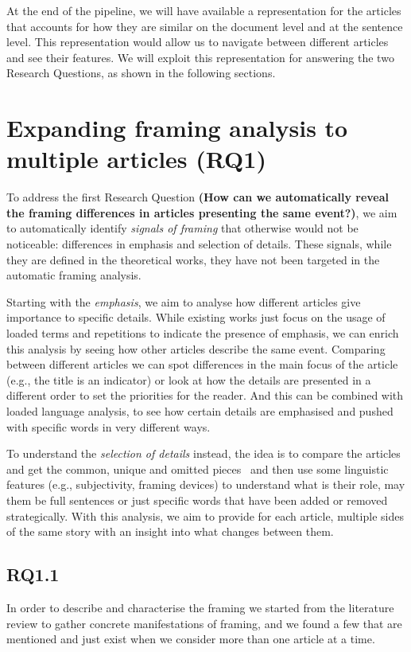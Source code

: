 At the end of the pipeline, we will have available a representation for the articles that accounts for how they are similar on the document level and at the sentence level.
This representation would allow us to navigate between different articles and see their features. We will exploit this representation for answering the two Research Questions, as shown in the following sections.

\section{Expanding framing analysis to multiple articles (RQ1)}
\label{sec:prop_rq1}

To address the first Research Question
\textbf{(How can we automatically reveal the framing differences in articles presenting the same event?)},
we aim to automatically identify \textit{signals of framing} that otherwise would not be noticeable: differences in emphasis and selection of details.
These signals, while they are defined in the theoretical works, they have not been targeted in the automatic framing analysis.

Starting with the \textit{emphasis}, we aim to analyse how different articles give importance to specific details.
While existing works just focus on the usage of loaded terms and repetitions to indicate the presence of emphasis, we can enrich this analysis by seeing how other articles describe the same event.
Comparing between different articles we can spot differences in the main focus of the article (e.g., the title is an indicator) or look at how the details are presented in a different order to set the priorities for the reader.
And this can be combined with loaded language analysis, to see how certain details are emphasised and pushed with specific words in very different ways.

To understand the \textit{selection of details} instead, the idea is to compare the articles and get the common, unique and omitted pieces~\cite{bountouridis2018explaining} and then use some linguistic features (e.g., subjectivity, framing devices) to understand what is their role, may them be full sentences or just specific words that have been added or removed strategically.
With this analysis, we aim to provide for each article, multiple sides of the same story with an insight into what changes between them.

\subsection{RQ1.1}
In order to describe and characterise the framing we started from the literature review to gather concrete manifestations of framing, and we found a few that are mentioned and just exist when we consider more than one article at a time.

